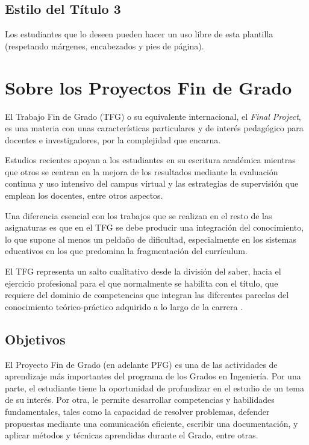 \subsection{Estilo del Título 3}

Los estudiantes que lo deseen pueden hacer un uso libre de esta plantilla (respetando márgenes, encabezados y pies de página).

\section{Sobre los Proyectos Fin de Grado}

El Trabajo Fin de Grado (TFG) o su equivalente internacional, el \textit{Final Project}, es una materia con unas características particulares y de interés pedagógico para docentes e investigadores, por la complejidad que encarna. 

Estudios recientes apoyan a los estudiantes en su escritura académica mientras que otros se centran en la mejora de los resultados mediante la evaluación continua y uso intensivo del campus virtual y las estrategias de supervisión que emplean los docentes, entre otros aspectos.

Una diferencia esencial con los trabajos que se realizan en el resto de las asignaturas es que en el TFG se debe producir una integración del conocimiento, lo que supone al menos un peldaño de dificultad, especialmente en los sistemas educativos en los que predomina la fragmentación del currículum.

El TFG representa un salto cualitativo desde la división del saber, hacia el ejercicio profesional para el que normalmente se habilita con el título, que requiere del dominio de competencias que integran las diferentes parcelas del conocimiento teórico-práctico adquirido a lo largo de la carrera \cite{definition}.

\subsection{Objetivos}


El Proyecto Fin de Grado (en adelante PFG) es una de las actividades de aprendizaje más importantes del programa de los Grados en Ingeniería. Por una parte, el estudiante tiene la oportunidad de profundizar en el estudio de un tema de su interés. Por otra, le permite desarrollar competencias y habilidades fundamentales, tales como la capacidad de resolver problemas, defender propuestas mediante una comunicación eficiente, escribir una documentación, y aplicar métodos y técnicas aprendidas durante el Grado, entre otras.

